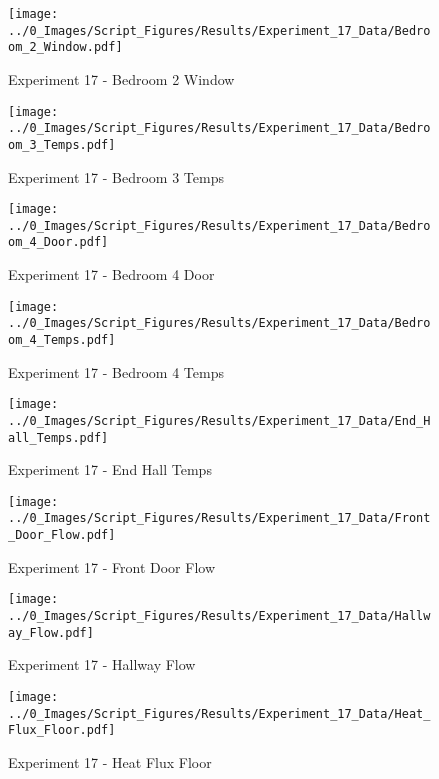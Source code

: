 	\clearpage

	\begin{figure}[H]
		\centering
		\texttt{[image: ../0\_Images/Script\_Figures/Results/Experiment\_17\_Data/Bedroom\_2\_Window.pdf]}
		\caption[]{Experiment 17 - Bedroom 2 Window}
	\end{figure}
 

	\begin{figure}[H]
		\centering
		\texttt{[image: ../0\_Images/Script\_Figures/Results/Experiment\_17\_Data/Bedroom\_3\_Temps.pdf]}
		\caption[]{Experiment 17 - Bedroom 3 Temps}
	\end{figure}
 
	\clearpage

	\begin{figure}[H]
		\centering
		\texttt{[image: ../0\_Images/Script\_Figures/Results/Experiment\_17\_Data/Bedroom\_4\_Door.pdf]}
		\caption[]{Experiment 17 - Bedroom 4 Door}
	\end{figure}
 

	\begin{figure}[H]
		\centering
		\texttt{[image: ../0\_Images/Script\_Figures/Results/Experiment\_17\_Data/Bedroom\_4\_Temps.pdf]}
		\caption[]{Experiment 17 - Bedroom 4 Temps}
	\end{figure}
 
	\clearpage

	\begin{figure}[H]
		\centering
		\texttt{[image: ../0\_Images/Script\_Figures/Results/Experiment\_17\_Data/End\_Hall\_Temps.pdf]}
		\caption[]{Experiment 17 - End Hall Temps}
	\end{figure}
 

	\begin{figure}[H]
		\centering
		\texttt{[image: ../0\_Images/Script\_Figures/Results/Experiment\_17\_Data/Front\_Door\_Flow.pdf]}
		\caption[]{Experiment 17 - Front Door Flow}
	\end{figure}
 
	\clearpage

	\begin{figure}[H]
		\centering
		\texttt{[image: ../0\_Images/Script\_Figures/Results/Experiment\_17\_Data/Hallway\_Flow.pdf]}
		\caption[]{Experiment 17 - Hallway Flow}
	\end{figure}
 

	\begin{figure}[H]
		\centering
		\texttt{[image: ../0\_Images/Script\_Figures/Results/Experiment\_17\_Data/Heat\_Flux\_Floor.pdf]}
		\caption[]{Experiment 17 - Heat Flux Floor}
	\end{figure}
 
